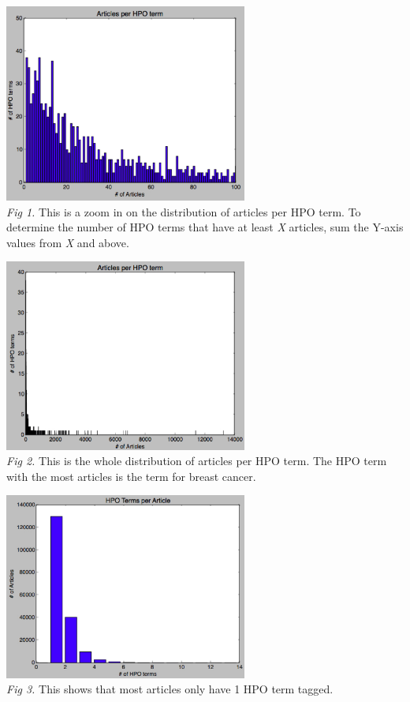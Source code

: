 \documentclass{ws-procs11x85}
\begin{document}
\begin{center}
  \includegraphics[width=8cm]{hpo-article}\\
 \small \textit{Fig 1.} This is a zoom in on the distribution of articles per HPO term. To determine the number of HPO terms that have at least \textit{X} articles, sum the Y-axis values from \textit{X} and above. 
\end{center}

\begin{center}
  \includegraphics[width=8cm]{hpo-article-zoomout}\\
 \small \textit{Fig 2.} This is the whole distribution of articles per HPO term. The HPO term with the most articles is the term for breast cancer. 
\end{center}

\begin{center}
  \includegraphics[width=8cm]{article-hpo}\\
 \small \textit{Fig 3.} This shows that most articles only have 1 HPO term tagged. 
\end{center}
\end{document}

